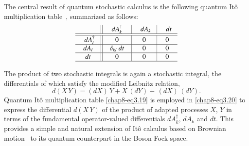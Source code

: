 The central result of quantum stochastic calculus is the following quantum It{\^o}  multiplication table~\cite{chap8-key7, chap8-key8}, summarized as follows: 
\begin{equation}    
\begin{tabular}{c||c|c|c}
&\hskip 0.1in $dA^\dag_k \hskip 0.1in$   &\hskip 0.1in $dA_k$ \hskip 0.1in & \hskip 0.1in $dt$ \hskip 0.1in \\ 
\hline 
\hline
\hskip 0.1in $dA^\dag_l$ \hskip 0.1in & 0 & 0 & 0 \\ 
\hline 
$dA_l$ & $\delta_{kl}\ dt$ & 0 & 0 \\ 
\hline 
$dt$ & 0 & 0 & 0 \\ 
\hline
\end{tabular}\label{chap8-eq3.19}
\end{equation}

The product of two stochastic integrals is again a stochastic integral, the  differentials of which satisfy the modified Leibnitz relation, 
\begin{equation}
d(X\,Y)= (dX)\, Y+ X\, (dY)+\, (dX)\, (dY).  \label{chap8-eq3.20}  
\end{equation} 
Quantum It\^{o} multiplication table \eqref{chap8-eq3.19}  is employed in \eqref{chap8-eq3.20} to express the differential $d(X\,Y)$ of the product of  adapted processes $X$, $Y$ in terms of the fundamental operator-valued differentials $dA^\dag_k,\, dA_k$ and $dt$.  This provides a simple and natural extension of It\^{o}  calculus based on Brownian motion~\cite{chap8-key38} to  its quantum counterpart in the Boson Fock space. 

